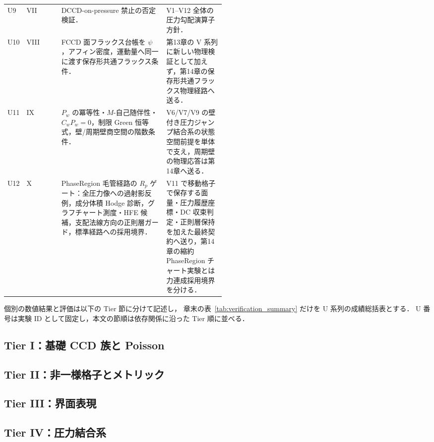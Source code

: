 \begin{table}[!ht]
\begin{tabularx}{\linewidth}{@{}>{\raggedright\arraybackslash}p{0.08\linewidth}>{\raggedright\arraybackslash}p{0.16\linewidth}>{\raggedright\arraybackslash}X>{\raggedright\arraybackslash}p{0.27\linewidth}@{}}
U9 & VII & DCCD-on-pressure 禁止の否定検証． & V1--V12 全体の圧力勾配演算子方針． \\
U10 & VIII & FCCD 面フラックス台帳を $\psi$，アフィン密度，運動量へ同一に渡す保存形共通フラックス条件． & 第13章の V 系列に新しい物理検証として加えず，第14章の保存形共通フラックス物理経路へ送る． \\
U11 & IX & $P_w$ の冪等性・$M$-自己随伴性・$C_wP_w=0$，制限 Green 恒等式，壁/周期壁商空間の階数条件． & V6/V7/V9 の壁付き圧力ジャンプ結合系の状態空間前提を単体で支え，周期壁の物理応答は第14章へ送る． \\
U12 & X & PhaseRegion 毛管経路の $R_p$ ゲート：全圧力像への過射影反例，成分体積 Hodge 診断，グラフチャート測度・HFE 候補，支配法線方向の正則層ガード，標準経路への採用境界． & V11 で移動格子で保存する面量・圧力履歴座標・DC 収束判定・正則層保持を加えた最終契約へ送り，第14章の縮約 PhaseRegion チャート実験とは力連成採用境界を分ける． \\
\bottomrule
\end{tabularx}
\end{table}

個別の数値結果と評価は以下の Tier 節に分けて記述し，
章末の表~\ref{tab:verification_summary} だけを U 系列の成績総括表とする．
U 番号は実験 ID として固定し，本文の節順は依存関係に沿った Tier 順に並べる．

\FloatBarrier

\subsection{Tier I：基礎 CCD 族と Poisson}

\subsection{Tier II：非一様格子とメトリック}

\subsection{Tier III：界面表現}

\subsection{Tier IV：圧力結合系}


